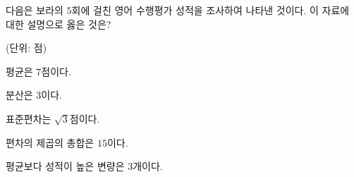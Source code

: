 다음은 보라의 $5$회에 걸친 영어 수행평가 성적을 조사하여 나타낸 것이다. 이 자료에 대한 설명으로 옳은 것은?\par\noindent\hfill{\footnotesize (단위: 점)}
\begin{choicesv}{\rule[-3ex]{0pt}{8ex}평균은 $7$점이다.}{\rule[-3ex]{0pt}{8ex}분산은 $3$이다.}{\rule[-3ex]{0pt}{8ex}표준편차는 $\sqrt{3}$점이다.}{\rule[-3ex]{0pt}{8ex}편차의 제곱의 총합은 $15$이다.}{\rule[-3ex]{0pt}{8ex}평균보다 성적이 높은 변량은 $3$개이다.}\end{choicesv}
